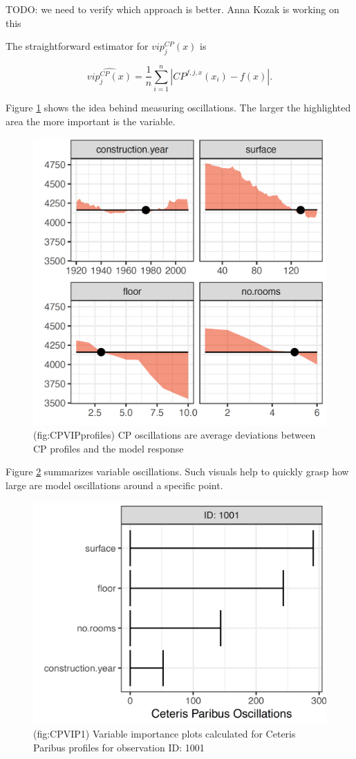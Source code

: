 \documentclass[]{krantz}
\theoremstyle{definition}
\theoremstyle{definition}
\theoremstyle{definition}
\theoremstyle{remark}
\begin{document}
TODO: we need to verify which approach is better. Anna Kozak is working
on this

The straightforward estimator for \(vip^{CP}_j(x)\) is

\[
\widehat{ vip^{CP}_j(x)} = \frac 1n \sum_{i=1}^n |CP^{f,j,x}(x_i) - f(x)|.
\]

Figure \ref{fig:CPVIPprofiles} shows the idea behind measuring
oscillations. The larger the highlighted area the more important is the
variable.

\begin{figure}

{\centering \includegraphics[width=0.5\linewidth]{figure/CP_VIP_profiles} 

}

\caption{(fig:CPVIPprofiles) CP oscillations are average deviations between CP profiles and the model response}\label{fig:CPVIPprofiles}
\end{figure}

Figure \ref{fig:CPVIP1} summarizes variable oscillations. Such visuals
help to quickly grasp how large are model oscillations around a specific
point.

\begin{figure}

{\centering \includegraphics[width=0.4\linewidth]{figure/cp_vip_1} 

}

\caption{(fig:CPVIP1) Variable importance plots calculated for Ceteris Paribus profiles for observation ID: 1001}\label{fig:CPVIP1}
\end{figure}
\end{document}
